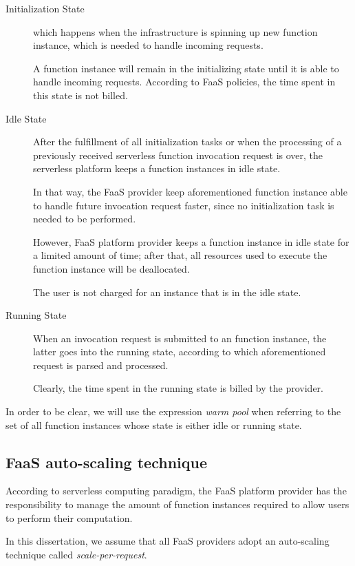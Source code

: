 \documentclass[12pt,a4paper]{report}
\begin{document}
\begin{description}
	
	\item[Initialization State] which happens when the infrastructure is spinning up new function instance, which is needed to handle incoming requests. 
	
	A function instance will remain in the initializing state until it is able to handle incoming requests. According to FaaS policies, the time spent in this state is not billed. 
	
	\item[Idle State] After the fulfillment of all initialization tasks or when the processing of a previously received serverless function invocation request is over, the serverless platform keeps a function instances in idle state.
	
	In that way, the FaaS provider keep aforementioned function instance able to handle future invocation request faster, since no initialization task is needed to be performed.
	
	However, FaaS platform provider keeps a function instance in idle state for a limited amount of time; after that, all resources used to execute the function instance will be deallocated.
	
	The user is not charged for an instance that is in the idle state.
	
	\item[Running State] When an invocation request is submitted to an function instance, the latter goes into the running state, according to which aforementioned request is parsed and processed.
	
	Clearly, the time spent in the running state is billed by the provider.
	
\end{description}

In order to be clear, we will use the expression \textit{warm pool} when referring to the set of all function instances whose state is either idle or running state.

\subsection{FaaS auto-scaling technique}

According to serverless computing paradigm, the FaaS platform provider has the responsibility to manage the amount of function instances required to allow users to perform their computation.

In this dissertation, we assume that all FaaS providers adopt an auto-scaling technique called \textit{scale-per-request}.
\end{document}
